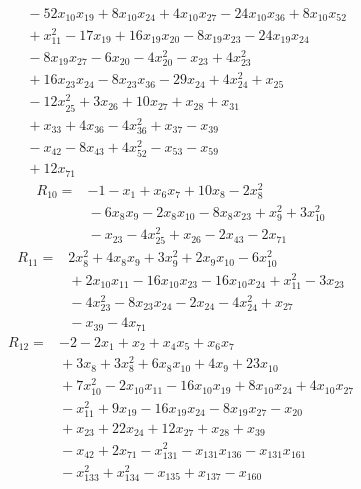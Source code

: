 {\begin{align*}
&{}  - 52x_{10} x_{19} + 8x_{10} x_{24} + 4x_{10} x_{27} - 24x_{10} x_{36} + 8x_{10} x_{52} \\
&{}  + x_{11}^{2} - 17x_{19} + 16x_{19} x_{20} - 8x_{19} x_{23} - 24x_{19} x_{24} \\
&{}  - 8x_{19} x_{27} - 6x_{20} - 4x_{20}^{2} - x_{23} + 4x_{23}^{2} \\
&{}  + 16x_{23} x_{24} - 8x_{23} x_{36} - 29x_{24} + 4x_{24}^{2} + x_{25} \\
&{}  - 12x_{25}^{2} + 3x_{26} + 10x_{27} + x_{28} + x_{31} \\
&{}  + x_{33} + 4x_{36} - 4x_{36}^{2} + x_{37} - x_{39} \\
&{}  - x_{42} - 8x_{43} + 4x_{52}^{2} - x_{53} - x_{59} \\
&{}  + 12x_{71}
\end{align*}
\begin{align*}
R_{10} ={}& -1 - x_{1} + x_{6} x_{7} + 10x_{8} - 2x_{8}^{2} \\
&{}  - 6x_{8} x_{9} - 2x_{8} x_{10} - 8x_{8} x_{23} + x_{9}^{2} + 3x_{10}^{2} \\
&{}  - x_{23} - 4x_{25}^{2} + x_{26} - 2x_{43} - 2x_{71}
\end{align*}
\begin{align*}
R_{11} ={}& 2x_{8}^{2} + 4x_{8} x_{9} + 3x_{9}^{2} + 2x_{9} x_{10} - 6x_{10}^{2} \\
&{}  + 2x_{10} x_{11} - 16x_{10} x_{23} - 16x_{10} x_{24} + x_{11}^{2} - 3x_{23} \\
&{}  - 4x_{23}^{2} - 8x_{23} x_{24} - 2x_{24} - 4x_{24}^{2} + x_{27} \\
&{}  - x_{39} - 4x_{71}
\end{align*}
\begin{align*}
R_{12} ={}& -2 - 2x_{1} + x_{2} + x_{4} x_{5} + x_{6} x_{7} \\
&{}  + 3x_{8} + 3x_{8}^{2} + 6x_{8} x_{10} + 4x_{9} + 23x_{10} \\
&{}  + 7x_{10}^{2} - 2x_{10} x_{11} - 16x_{10} x_{19} + 8x_{10} x_{24} + 4x_{10} x_{27} \\
&{}  - x_{11}^{2} + 9x_{19} - 16x_{19} x_{24} - 8x_{19} x_{27} - x_{20} \\
&{}  + x_{23} + 22x_{24} + 12x_{27} + x_{28} + x_{39} \\
&{}  - x_{42} + 2x_{71} - x_{131}^{2} - x_{131} x_{136} - x_{131} x_{161} \\
&{}  - x_{133}^{2} + x_{134}^{2} - x_{135} + x_{137} - x_{160} \\

\end{align*}}
